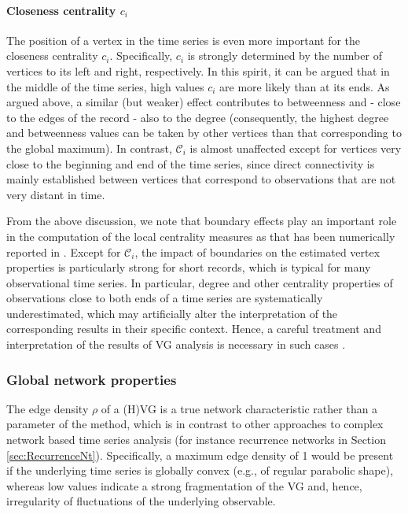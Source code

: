 		\paragraph{Closeness centrality $c_i$}
		The position of a vertex in the time series is even more important for the closeness centrality $c_i$. Specifically, $c_i$ is strongly determined by the number of vertices to its left and right, respectively. In this spirit, it can be argued that in the middle of the time series, high values $c_i$ are more likely than at its ends. As argued above, a similar (but weaker) effect contributes to betweenness and - close to the edges of the record - also to the degree (consequently, the highest degree and betweenness values can be taken by other vertices than that corresponding to the global maximum). In contrast, $\mathcal{C}_i$ is almost unaffected except for vertices very close to the beginning and end of the time series, since direct connectivity is mainly established between vertices that correspond to observations that are not very distant in time. 
		
		From the above discussion, we note that boundary effects play an important role in the computation of the local centrality measures as that has been numerically reported in \cite{Donner2012}. Except for $\mathcal{C}_i$, the impact of boundaries on the estimated vertex properties is particularly strong for short records, which is typical for many observational time series. In particular, degree and other centrality properties of observations close to both ends of a time series are systematically underestimated, which may artificially alter the interpretation of the corresponding results in their specific context. Hence, a careful treatment and interpretation of the results of VG analysis is necessary in such cases \cite{Donner2012}.
				
		\subsubsection{Global network properties}
		The edge density $\rho$ of a (H)VG is a true network characteristic rather than a parameter of the method, which is in contrast to other approaches to complex network based time series analysis (for instance recurrence networks in Section \ref{sec:RecurrenceNt}). Specifically, a maximum edge density of 1 would be present if the underlying time series is globally convex (e.g., of regular parabolic shape), whereas low values indicate a strong fragmentation of the VG and, hence, irregularity of fluctuations of the underlying observable. 
		

